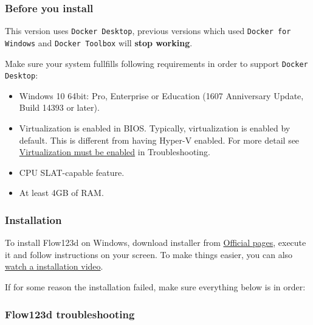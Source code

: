 \subsubsection{Before you install}

This version uses \verb'Docker Desktop', previous versions which used \verb'Docker for Windows' and \verb'Docker Toolbox' will \textbf{stop working}.

Make sure your system fullfills following requirements in order to support \verb'Docker Desktop':
\begin{itemize}
    \item Windows 10 64bit: Pro, Enterprise or Education (1607 Anniversary Update, Build 14393 or later).
    \item Virtualization is enabled in BIOS. Typically, virtualization is enabled by default. This is different from having Hyper-V enabled. For more detail see \href{https://docs.docker.com/docker-for-windows/troubleshoot/#virtualization-must-be-enabled}{Virtualization must be enabled} in Troubleshooting.
    \item CPU SLAT-capable feature.
    \item At least 4GB of RAM.
\end{itemize}


\subsubsection{Installation}

To install Flow123d on Windows, download installer from \href{http://flow123d.github.io/}{Official pages}, execute it and follow instructions
on your screen. To make things easier, you can also \href{https://www.youtube.com/watch?v=xDR2vU-1IhM}{watch a installation video}.

If for some reason the installation failed, make sure everything below is in order:


\subsubsection{Flow123d troubleshooting}

